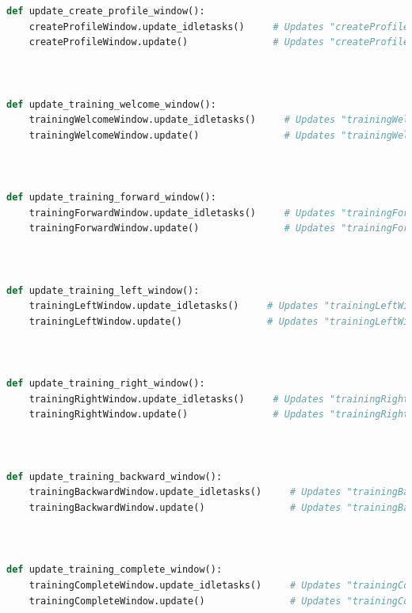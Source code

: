 \documentclass[conference]{IEEEtran}
\begin{document}
\begin{lstlisting}[language=Python, caption=GUI CODE, label=gui_code]
def update_create_profile_window():
    createProfileWindow.update_idletasks()     # Updates "createProfileWindow" window even if not called upon to prevent errors 
    createProfileWindow.update()               # Updates "createProfileWindow" window even if not called upon to prevent errors 



def update_training_welcome_window():
    trainingWelcomeWindow.update_idletasks()     # Updates "trainingWelcomeWindow" window even if not called upon to prevent errors 
    trainingWelcomeWindow.update()               # Updates "trainingWelcomeWindow" window even if not called upon to prevent errors 



def update_training_forward_window():
    trainingForwardWindow.update_idletasks()     # Updates "trainingForwardWindow" window even if not called upon to prevent errors 
    trainingForwardWindow.update()               # Updates "trainingForwardWindow" window even if not called upon to prevent errors 



def update_training_left_window():
    trainingLeftWindow.update_idletasks()     # Updates "trainingLeftWindow" window even if not called upon to prevent errors 
    trainingLeftWindow.update()               # Updates "trainingLeftWindow" window even if not called upon to prevent errors 



def update_training_right_window():
    trainingRightWindow.update_idletasks()     # Updates "trainingRightWindow" window even if not called upon to prevent errors 
    trainingRightWindow.update()               # Updates "trainingRightWindow" window even if not called upon to prevent errors 



def update_training_backward_window():
    trainingBackwardWindow.update_idletasks()     # Updates "trainingBackwardWindow" window even if not called upon to prevent errors 
    trainingBackwardWindow.update()               # Updates "trainingBackwardWindow" window even if not called upon to prevent errors 



def update_training_complete_window():
    trainingCompleteWindow.update_idletasks()     # Updates "trainingCompleteWindow" window even if not called upon to prevent errors 
    trainingCompleteWindow.update()               # Updates "trainingCompleteWindow" window even if not called upon to prevent errors 




\end{lstlisting}
\end{document}
